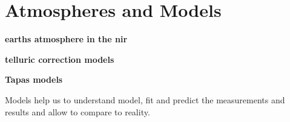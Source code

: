 
\chapter{Atmospheres and Models}

\textbf{earths atmosphere in the nir}




\textbf{telluric correction models}

\textbf{Tapas models}





Models help us to understand model, fit and predict the measurements and results and allow to compare to reality.







